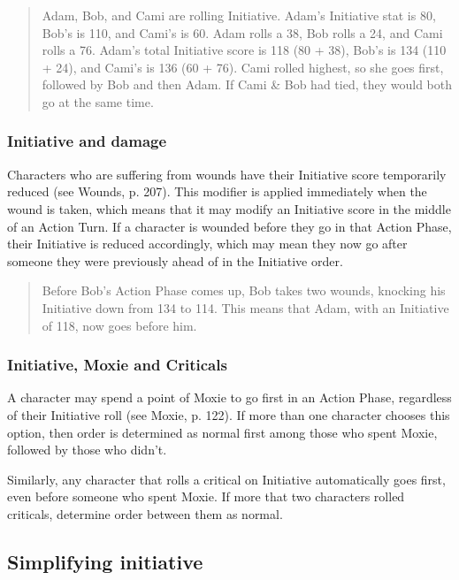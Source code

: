 \begin{quotation} Adam, Bob, and Cami are rolling Initiative. Adam’s Initiative stat is 80, Bob’s is 110, and Cami’s is 60. Adam rolls a 38, Bob rolls a 24, and Cami rolls a 76. Adam’s total Initiative score is 118 (80 + 38), Bob’s is 134 (110 + 24), and Cami’s is 136 (60 + 76). Cami rolled highest, so she goes first, followed by Bob and then Adam. If Cami \& Bob had tied, they would both go at the same time. \end{quotation} 

\subsubsection{Initiative and damage} 

Characters who are suffering from wounds have their Initiative score temporarily reduced (see Wounds, p. 207). This modifier is applied immediately when the wound is taken, which means that it may modify an Initiative score in the middle of an Action Turn. If a character is wounded before they go in that Action Phase, their Initiative is reduced accordingly, which may mean they now go after someone they were previously ahead of in the Initiative order. 

\begin{quotation} Before Bob’s Action Phase comes up, Bob takes two wounds, knocking his Initiative down from 134 to 114. This means that Adam, with an Initiative of 118, now goes before him. \end{quotation} 

\subsubsection{Initiative, Moxie and Criticals} 

A character may spend a point of Moxie to go first in an Action Phase, regardless of their Initiative roll (see Moxie, p. 122). If more than one character chooses this option, then order is determined as normal first among those who spent Moxie, followed by those who didn’t. 

Similarly, any character that rolls a critical on Initiative automatically goes first, even before someone who spent Moxie. If more that two characters rolled criticals, determine order between them as normal. 

\subsection{Simplifying initiative} \label{sec:simplifying-init} 

